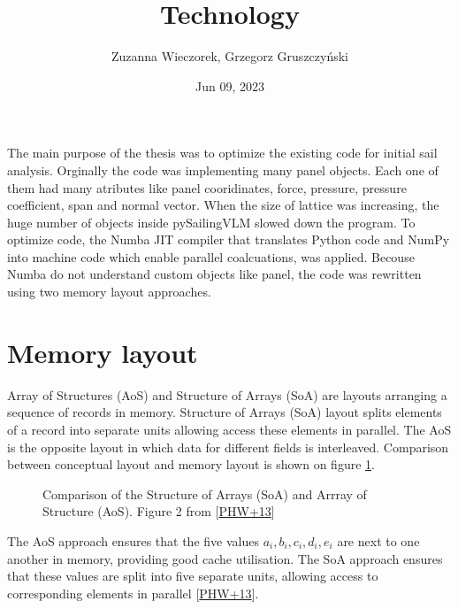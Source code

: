 \documentclass[a4paper,12pt,english]{jupyterBook}
\title{Technology}
\date{Jun 09, 2023}
\author{Zuzanna Wieczorek, Grzegorz Gruszczyński}
\let\sphinxpxdimen\pdfpxdimen\else\newdimen\sphinxpxdimen
\begin{document}
\pagestyle{empty}
\sphinxmaketitle
\clearpage

\pagestyle{plain}
\sphinxtableofcontents
\pagestyle{normal}
\label{\detokenize{chapters/description/technology::doc}}


\sphinxAtStartPar
The main purpose of the thesis was to optimize the existing code for initial sail analysis.
Orginally the code was implementing many panel objects. Each one of them had many atributes like panel cooridinates, force, pressure, pressure coefficient, span and normal vector. When the size of lattice was increasing, the huge number of objects inside pySailingVLM slowed down the program. To optimize code, the Numba \sphinxhyphen{} JIT compiler that translates Python code and NumPy into machine code which enable parallel coalcuations, was applied. Becouse Numba do not understand custom objects like panel, the code was rewritten using two memory layout approaches.


\part{Memory layout}
\label{\detokenize{chapters/description/technology:memory-layout}}
\sphinxAtStartPar
Array of Structures (AoS) and Structure of Arrays (SoA) are layouts arranging a sequence of records in memory. Structure of Arrays (SoA) layout splits elements of a record into separate units allowing access these elements in parallel. The AoS is the opposite layout in which data for different fields is interleaved. Comparison between conceptual layout and memory layout is shown on figure \hyperref[\detokenize{chapters/description/technology:id2}]{\ref{\detokenize{chapters/description/technology:id2}}}.

\begin{figure}[htbp]
\centering
\capstart

\noindent\sphinxincludegraphics[height=300\sphinxpxdimen]{{memory_layout}.png}
\caption{Comparison of the Structure of Arrays (SoA) and Arrray of Structure (AoS). Figure 2 from {[}\hyperlink{cite.chapters/bibliography:id11}{PHW+13}{]}}\label{\detokenize{chapters/description/technology:id2}}\end{figure}

\sphinxAtStartPar
The AoS approach ensures that the five values \(a_i, b_i, c_i, d_i, e_i\) are
next to one another in memory, providing good cache utilisation. The SoA approach ensures that these values are split into five separate units, allowing access to corresponding elements in parallel {[}\hyperlink{cite.chapters/bibliography:id11}{PHW+13}{]}.
\end{document}
